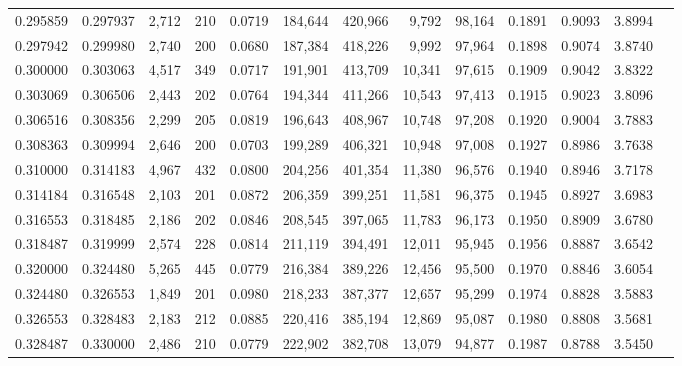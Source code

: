 \begin{tabular}{rrrrrrrrrrrrr}
0.295859 & 0.297937 & 2,712 & 210 &                                     0.0719 & 184,644 & 420,966 &   9,792 &  98,164 & 0.1891 & 0.9093 & 3.8994 \\
0.297942 & 0.299980 & 2,740 & 200 &                                     0.0680 & 187,384 & 418,226 &   9,992 &  97,964 & 0.1898 & 0.9074 & 3.8740 \\
0.300000 & 0.303063 & 4,517 & 349 &                                     0.0717 & 191,901 & 413,709 &  10,341 &  97,615 & 0.1909 & 0.9042 & 3.8322 \\
0.303069 & 0.306506 & 2,443 & 202 &                                     0.0764 & 194,344 & 411,266 &  10,543 &  97,413 & 0.1915 & 0.9023 & 3.8096 \\
0.306516 & 0.308356 & 2,299 & 205 &                                     0.0819 & 196,643 & 408,967 &  10,748 &  97,208 & 0.1920 & 0.9004 & 3.7883 \\
0.308363 & 0.309994 & 2,646 & 200 &                                     0.0703 & 199,289 & 406,321 &  10,948 &  97,008 & 0.1927 & 0.8986 & 3.7638 \\
0.310000 & 0.314183 & 4,967 & 432 &                                     0.0800 & 204,256 & 401,354 &  11,380 &  96,576 & 0.1940 & 0.8946 & 3.7178 \\
0.314184 & 0.316548 & 2,103 & 201 &                                     0.0872 & 206,359 & 399,251 &  11,581 &  96,375 & 0.1945 & 0.8927 & 3.6983 \\
0.316553 & 0.318485 & 2,186 & 202 &                                     0.0846 & 208,545 & 397,065 &  11,783 &  96,173 & 0.1950 & 0.8909 & 3.6780 \\
0.318487 & 0.319999 & 2,574 & 228 &                                     0.0814 & 211,119 & 394,491 &  12,011 &  95,945 & 0.1956 & 0.8887 & 3.6542 \\
0.320000 & 0.324480 & 5,265 & 445 &                                     0.0779 & 216,384 & 389,226 &  12,456 &  95,500 & 0.1970 & 0.8846 & 3.6054 \\
0.324480 & 0.326553 & 1,849 & 201 &                                     0.0980 & 218,233 & 387,377 &  12,657 &  95,299 & 0.1974 & 0.8828 & 3.5883 \\
0.326553 & 0.328483 & 2,183 & 212 &                                     0.0885 & 220,416 & 385,194 &  12,869 &  95,087 & 0.1980 & 0.8808 & 3.5681 \\
0.328487 & 0.330000 & 2,486 & 210 &                                     0.0779 & 222,902 & 382,708 &  13,079 &  94,877 & 0.1987 & 0.8788 & 3.5450 \\

\end{tabular}
